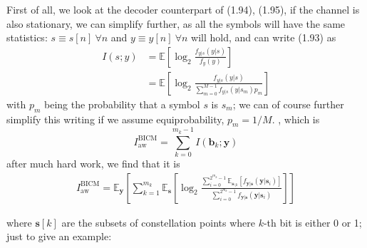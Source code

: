 \documentclass[a4paper, 11pt]{book}
\begin{document}
\vspace{0.5em}

First of all, we look at the decoder counterpart of (1.94), (1.95),
if the channel is also stationary, we can simplify further, as all the symbols will have the same statistics: $s \equiv s[n] \ \forall n$ and $y \equiv y[n] \ \forall n$ will hold, and can write (1.93) as
\begin{align}
I(s; y) &= \mathbb{E}\left[ \log_2 \frac{f_{y|s}(y|s)}{f_y(y)} \right] \tag{1.94} \\
&= \mathbb{E}\left[ \log_2 \frac{f_{y|s}(y|s)}{\sum_{m=0}^{M-1} f_{y|s}(y|s_m)p_m} \right] \tag{1.95}
\end{align}
with $p_m$ being the probability that a symbol $s$ is $s_m$; we can of course further simplify this writing if we assume equiprobability, $p_m = 1/M$.
, which is
$$
I^{\text{BICM}}_{\text{aw}} = \sum_{k=0}^{m_k-1} I(\bm{b}_k; \bm{y})
$$
after much hard work, we find that it is
\begin{align}
I^{\text{BICM}}_{\text{aw}} = \mathbb{E}_{\bm{y}} \left[ \sum_{k=1}^{m_k} \mathbb{E}_{\bm{s}} \left[ \log_2 \frac{\sum_{i=0}^{2^{m_k}-1} \mathbb{E}_{\bm{s}_{\setminus k}} [f_{\bm{y}|\bm{s}}(\bm{y}|\bm{s}_{i})]}{\sum_{i=0}^{2^{m_k}-1} f_{\bm{y}|\bm{s}}(\bm{y}|\bm{s}_i)} \right] \right] \tag{1.137}
\end{align}

where $\bm{s}[k]$ are the subsets of constellation points where $k$-th bit is either 0 or 1; just to give an example:
\end{document}
